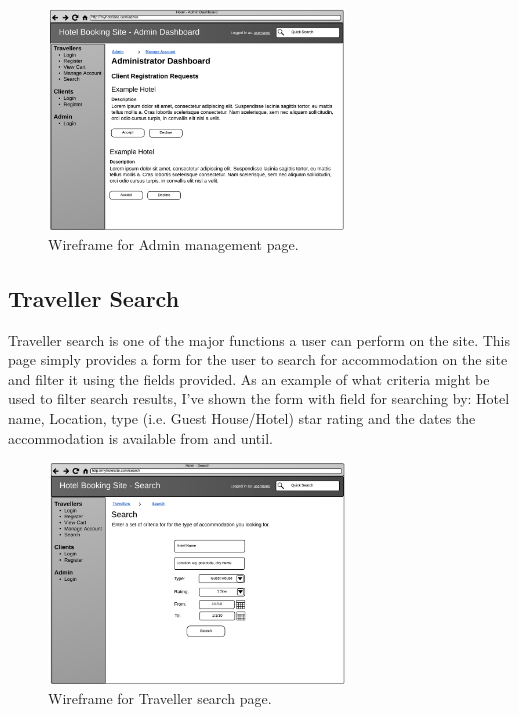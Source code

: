 \documentclass{article}
\begin{document}
\begin{figure}[H]
\centering
\includegraphics[width=0.7\textwidth]{img/wireframes/Administrator.png}
\caption{Wireframe for Admin management page.}
\label{fig:wireframe-client-register}
\end{figure}


\subsection{Traveller Search}
Traveller search is one of the major functions a user can perform on the site. This page simply provides a form for the user to search for accommodation on the site and filter it using the fields provided. As an example of what criteria might be used to filter search results, I've shown the form with field for searching by: Hotel name, Location, type (i.e. Guest House/Hotel) star rating and the dates the accommodation is available from and until.

\begin{figure}[H]
\centering
\includegraphics[width=0.7\textwidth]{img/wireframes/Search.png}
\caption{Wireframe for Traveller search page.}
\label{fig:wireframe-traveller-search}
\end{figure}
\end{document}
